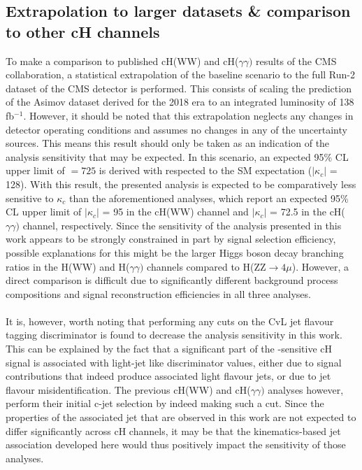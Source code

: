 \subsection{Extrapolation to larger datasets \& comparison to other cH channels}
To make a comparison to published cH(WW) and cH($\gamma\gamma)$ results of the CMS collaboration, a statistical extrapolation of the baseline scenario to the full Run-2 dataset of the CMS detector is performed. This consists of scaling the prediction of the Asimov dataset derived for the 2018 era to an integrated luminosity of 138 fb$^{-1}$. However, it should be noted that this extrapolation neglects any changes in detector operating conditions and assumes no changes in any of the uncertainty sources. This means this result should only be taken as an indication of the analysis sensitivity that may be expected. In this scenario, an expected 95\% CL upper limit of \sBR$ = 725$ is derived with respected to the SM expectation ($\mid$$\kappa_c$$\mid$ = 128). With this result, the presented \cHZZ analysis is expected to be comparatively less sensitive to $\kappa_c$ than the aforementioned analyses, which report an expected 95\% CL upper limit of $\mid$$\kappa_c$$\mid$ = 95 in the cH(WW) channel and $\mid$$\kappa_c$$\mid$ = 72.5 in the cH($\gamma\gamma)$ channel, respectively. Since the sensitivity of the analysis presented in this work appears to be strongly constrained in part by signal selection efficiency, possible explanations for this might be the larger Higgs boson decay branching ratios in the H(WW) and H($\gamma\gamma)$ channels compared to H(ZZ$\rightarrow4\mu$). However, a direct comparison is difficult due to significantly different background process compositions and signal reconstruction efficiencies in all three analyses. \\
\\
It is, however, worth noting that performing any cuts on the CvL jet flavour tagging discriminator is found to decrease the analysis sensitivity in this work. This can be explained by the fact that a significant part of the \kappac-sensitive cH signal is associated with light-jet like discriminator values, either due to signal contributions that indeed produce associated light flavour jets, or due to jet flavour misidentification. The previous cH(WW) and cH($\gamma\gamma)$ analyses however, perform their initial c-jet selection by indeed making such a cut. Since the properties of the associated jet that are observed in this work are not expected to differ significantly across cH channels, it may be that the kinematics-based jet association developed here would thus positively impact the sensitivity of those analyses. \\
